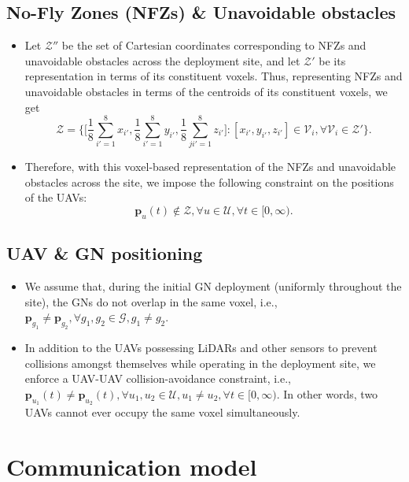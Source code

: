 \documentclass{article}
\begin{document}
\subsection{No-Fly Zones (NFZs) \& Unavoidable obstacles}
\begin{itemize}
    \item Let $\mathcal{Z}''$ be the set of Cartesian coordinates corresponding to NFZs and unavoidable obstacles across the deployment site, and let $\mathcal{Z}'$ be its representation in terms of its constituent voxels. Thus, representing NFZs and unavoidable obstacles in terms of the centroids of its constituent voxels, we get
    $$\mathcal{Z}{=}\Bigg\{\Bigg[\frac{1}{8}\sum_{i'{=}1}^{8}x_{i'},\frac{1}{8}\sum_{i'{=}1}^{8}y_{i'},\frac{1}{8}\sum_{ji'{=}1}^{8}z_{i'}\Bigg]:[x_{i'},y_{i'},z_{i'}]{\in}\mathcal{V}_{i},{\forall}\mathcal{V}_{i}{\in}\mathcal{Z}'\Bigg\}.$$
    \item Therefore, with this voxel-based representation of the NFZs and unavoidable obstacles across the site, we impose the following constraint on the positions of the UAVs:
    $$\mathbf{p}_{u}(t){\notin}\mathcal{Z},{\forall}u{\in}\mathcal{U},{\forall}t{\in}[0,\infty).$$
\end{itemize}

\subsection{UAV \& GN positioning}
\begin{itemize}
    \item We assume that, during the initial GN deployment (uniformly throughout the site), the GNs do not overlap in the same voxel, i.e., $\mathbf{p}_{g_{1}}{\neq}\mathbf{p}_{g_{2}},{\forall}g_{1},g_{2}{\in}\mathcal{G},g_{1}{\neq}g_{2}$.
    \item In addition to the UAVs possessing LiDARs and other sensors to prevent collisions amongst themselves while operating in the deployment site, we enforce a UAV-UAV collision-avoidance constraint, i.e., $\mathbf{p}_{u_{1}}(t){\neq}\mathbf{p}_{u_{2}}(t),{\forall}u_{1},u_{2}{\in}\mathcal{U},u_{1}{\neq}u_{2},{\forall}t{\in}[0,\infty)$. In other words, two UAVs cannot ever occupy the same voxel simultaneously. 
\end{itemize}

\section{Communication model}
\footnotesize
\end{document}
